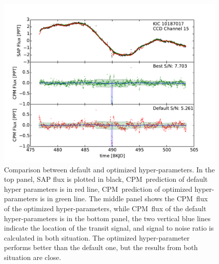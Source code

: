 \documentclass[12pt, preprint]{aastex}
\newcommand{\name}{CPM}
\begin{document}
\begin{figure}[htb]
\centering
\includegraphics[width=\columnwidth]{compare_10187017}
\caption{\label{hyperparameter} Comparison between default and optimized hyper-parameters. 
In the top panel, SAP flux is plotted in black, \name\ prediction of default hyper parameters is in red line, 
\name\ prediction of optimized hyper-parameters is in green line. 
The middle panel shows the \name\ flux of the optimized hyper-parameters, 
while \name\ flux of the default hyper-parameters is in the bottom panel, 
the two vertical blue lines indicate the location of the transit signal, and signal to noise ratio is calculated in both situation. 
The optimized hyper-parameter performs better than the default one, but the results from both situation are close.}
\end{figure}

\clearpage
\end{document}
